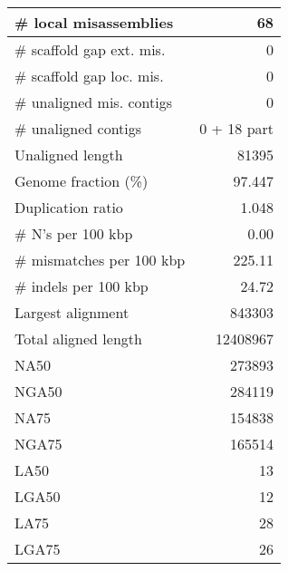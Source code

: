 \documentclass[12pt,a4paper]{article}
\begin{document}
\begin{table}[ht]
\begin{center}
\begin{tabular}{|l*{1}{|r}|}
\# local misassemblies & 68 \\ \hline
\# scaffold gap ext. mis. & 0 \\ \hline
\# scaffold gap loc. mis. & 0 \\ \hline
\# unaligned mis. contigs & 0 \\ \hline
\# unaligned contigs & 0 + 18 part \\ \hline
Unaligned length & 81395 \\ \hline
Genome fraction (\%) & 97.447 \\ \hline
Duplication ratio & 1.048 \\ \hline
\# N's per 100 kbp & 0.00 \\ \hline
\# mismatches per 100 kbp & 225.11 \\ \hline
\# indels per 100 kbp & 24.72 \\ \hline
Largest alignment & 843303 \\ \hline
Total aligned length & 12408967 \\ \hline
NA50 & 273893 \\ \hline
NGA50 & 284119 \\ \hline
NA75 & 154838 \\ \hline
NGA75 & 165514 \\ \hline
LA50 & 13 \\ \hline
LGA50 & 12 \\ \hline
LA75 & 28 \\ \hline
LGA75 & 26 \\ \hline
\end{tabular}
\end{center}
\end{table}
\end{document}
